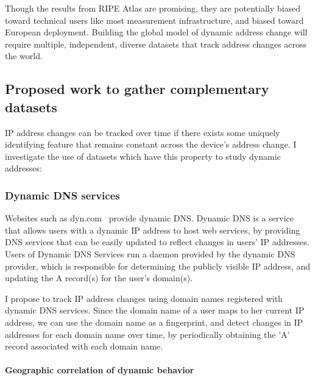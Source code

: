 Though the results from RIPE Atlas are promising, they are potentially
biased toward technical users like most measurement infrastructure,
and biased toward European deployment. Building the global model of dynamic address change will
require multiple, independent, diverse datasets that track address changes across
the world.

\subsection{Proposed work to gather complementary datasets}

IP address changes can
be tracked over time if there exists some uniquely identifying feature
that remains constant across the device's address change. I investigate the use of datasets which have this
property to study dynamic addresses:



\subsubsection{Dynamic DNS services}

Websites such as dyn.com~\cite{dyn} provide dynamic DNS. Dynamic
DNS is a service that allows users with a dynamic IP address to host
web services, by providing DNS services that can be easily updated to
reflect changes in users' IP addresses. Users of Dynamic DNS Services
run a daemon provided by the dynamic DNS provider, which is responsible for
determining the publicly visible IP address, and updating the A
record(s) for the user's domain(s). 

I propose to track IP address changes using domain names
registered with dynamic DNS services. Since the domain name of a user
maps to her current IP address, we can use the domain name as a
fingerprint, and detect changes in IP addresses for each domain name
over time, by periodically obtaining the 'A' record associated with
each domain name. 

\paragraph{Geographic correlation of dynamic behavior}


